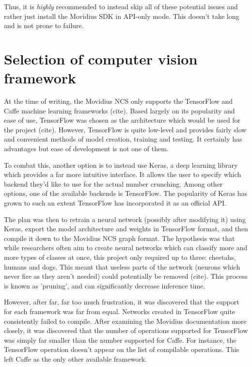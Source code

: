 Thus, it is \emph{highly} recommended to instead skip all of these potential issues and rather just install the Movidius SDK in API-only mode. This doesn't take long and is not prone to failure.


\section{Selection of computer vision framework}
At the time of writing, the Movidius NCS only supports the TensorFlow and Caffe machine learning frameworks {\color{red} (cite)}. Based largely on its popularity and ease of use, TensorFlow was chosen as the architecture which would be used for the project {\color{red} (cite)}. However, TensorFlow is quite low-level and provides fairly slow and convenient methods of model creation, training and testing. It certainly has advantages but ease of development is not one of them.

To combat this, another option is to instead use Keras, a deep learning library which provides a far more intuitive interface. It allows the user to specify which backend they'd like to use for the actual number crunching. Among other options, one of the available backends is TensorFlow. The popularity of Keras has grown to such an extent TensorFlow has incorporated it as an official API.

The plan was then to retrain a neural network (possibly after modifying it) using Keras, export the model architecture and weights in TensorFlow format, and then compile it down to the Movidius NCS graph format. The hypothesis was that while researchers often aim to create neural networks which can classify more and more types of classes at once, this project only required up to three: cheetahs, humans and dogs. This meant that useless parts of the network (neurons which never fire as they aren't needed) could potentially be removed {\color{red} (cite)}. This process is known as 'pruning', and can significantly decrease inference time.

However, after far, far too much frustration, it was discovered that the support for each framework was far from equal. Networks created in TensorFlow quite consistently failed to compile. After examining the Movidius documentation more closely, it was discovered that the number of operations supported for TensorFlow was simply far smaller than the number supported for Caffe. For instance, the TensorFlow  operation doesn't appear on the list of compilable operations. This left Caffe as the only other available framework.

